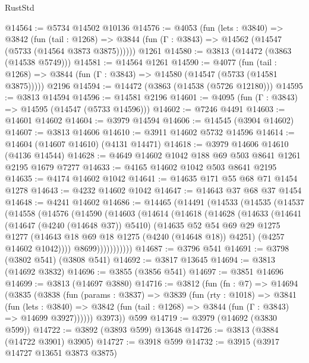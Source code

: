 \begin{lexlean}{RustStd}
\begin{coremodule}
@14564 := @5734 @14502 @10136
@14576 := @4053
    (fun (lets : @3840) =>
    @3842
      (fun (tail : @1268) =>
      @3844 (fun (Γ : @3843) => @14562 (@14547 (@5733 (@14564 @3873 @3875))))))
    @1261
@14580 := @3813 (@14472 (@3863 (@14538 @5749)))
@14581 := @14564 @1261
@14590 := @4077
    (fun (tail : @1268) => @3844 (fun (Γ : @3843) => @14580 (@14547 (@5733 (@14581 @3875)))))
    @2196
@14594 := @14472 (@3863 (@14538 (@5726 @12180)))
@14595 := @3813 @14594
@14596 := @14581 @2196
@14601 := @4095 (fun (Γ : @3843) => @14595 (@14547 (@5733 @14596)))
@14602 := @7246 @4491
@14603 := @14601 @14602
@14604 := @3979 @14594
@14606 := @14545 (@3904 @14602)
@14607 := @3813 @14606
@14610 := @3911 @14602 @5732 @14596
@14614 := @14604 (@14607 @14610) (@4131 @14471)
@14618 := @3979 @14606 @14610 (@4136 @14544)
@14628 := @4649 @14602 @1042 @188 @69 @503 @8641 @1261 @2195 @1679 @7277
@14633 := @4165 @14602 @1042 @503 @8641 @2195
@14635 := @4174 @14602 @1042
@14641 := @14635 @171 @55 @68 @71 @1454 @1278
@14643 := @4232 @14602 @1042
@14647 := @14643 @37 @68 @37 @1454
@14648 := @4241 @14602
@14686 := @14465
    (@14491
      (@14533
        (@14535
          (@14537
            (@14558
              (@14576
                (@14590
                  (@14603
                    (@14614
                      (@14618
                        (@14628
                          (@14633
                            (@14641
                              (@14647 (@4240 (@14648 @37)) @5410)
                              (@14635
                                @52
                                @54
                                @69
                                @29
                                @1275
                                @1277
                                (@14643 @18 @69 @18 @1275 (@4240 (@14648 @18)) @4251)
                                (@4257 @14602 @1042))))
                          @8699)))))))))))
@14687 := @3796 @541
@14691 := @3798 (@3802 @541) (@3808 @541)
@14692 := @3817 @13645
@14694 := @3813 (@14692 @3832)
@14696 := @3855 (@3856 @541)
@14697 := @3851 @14696
@14699 := @3813 (@14697 @3880)
@14716 := @3812
    (fun (fn : @7) =>
    @14694
      (@3835
        (@3838
          (fun (params : @3837) =>
          @3839
            (fun (rty : @1018) =>
            @3841
              (fun (lets : @3840) =>
              @3842 (fun (tail : @1268) => @3844 (fun (Γ : @3843) => @14699 @3927))))))
        @3973))
    @599
@14719 := @3979 (@14692 (@3830 @599))
@14722 := @3892 (@3893 @599) @13648
@14726 := @3813 (@3884 (@14722 @3901) @3905)
@14727 := @3918 @599
@14732 := @3915 (@3917 @14727 @13651 @3873 @3875)

\end{coremodule}
\end{lexlean}
